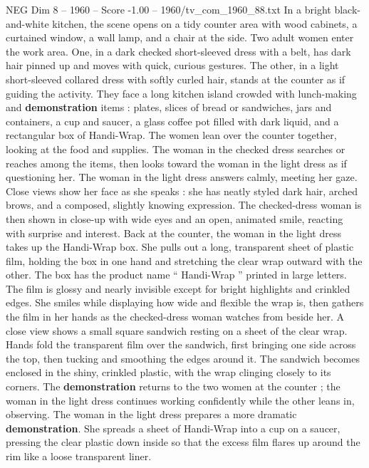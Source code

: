 \begin{textsample}{NEG Dim 8 – 1960 – Score -1.00 – 1960/tv\_com\_1960\_88.txt}  \label{ex:f8_neg_020}
In a bright black-and-white kitchen, the scene opens on a tidy counter area with wood cabinets, a curtained window, a wall lamp, and a chair at the side.
Two adult women enter the work area.
One, in a dark checked short-sleeved dress with a belt, has dark hair pinned up and moves with quick, curious gestures.
The other, in a light short-sleeved collared dress with softly curled hair, stands at the counter as if guiding the activity.
They face a long kitchen island crowded with lunch-making and \textbf{demonstration} items : plates, slices of bread or sandwiches, jars and containers, a cup and saucer, a glass coffee pot filled with dark liquid, and a rectangular box of Handi-Wrap.
The women lean over the counter together, looking at the food and supplies.
The woman in the checked dress searches or reaches among the items, then looks toward the woman in the light dress as if questioning her.
The woman in the light dress answers calmly, meeting her gaze.
Close views show her face as she speaks : she has neatly styled dark hair, arched brows, and a composed, slightly knowing expression.
The checked-dress woman is then shown in close-up with wide eyes and an open, animated smile, reacting with surprise and interest.
Back at the counter, the woman in the light dress takes up the Handi-Wrap box.
She pulls out a long, transparent sheet of plastic film, holding the box in one hand and stretching the clear wrap outward with the other.
The box has the product name “ Handi-Wrap ” printed in large letters.
The film is glossy and nearly invisible except for bright highlights and crinkled edges.
She smiles while displaying how wide and flexible the wrap is, then gathers the film in her hands as the checked-dress woman watches from beside her.
A close view shows a small square sandwich resting on a sheet of the clear wrap.
Hands fold the transparent film over the sandwich, first bringing one side across the top, then tucking and smoothing the edges around it.
The sandwich becomes enclosed in the shiny, crinkled plastic, with the wrap clinging closely to its corners.
The \textbf{demonstration} returns to the two women at the counter ; the woman in the light dress continues working confidently while the other leans in, observing.
The woman in the light dress prepares a more dramatic \textbf{demonstration}.
She spreads a sheet of Handi-Wrap into a cup on a saucer, pressing the clear plastic down inside so that the excess film flares up around the rim like a loose transparent liner.

\end{textsample}
